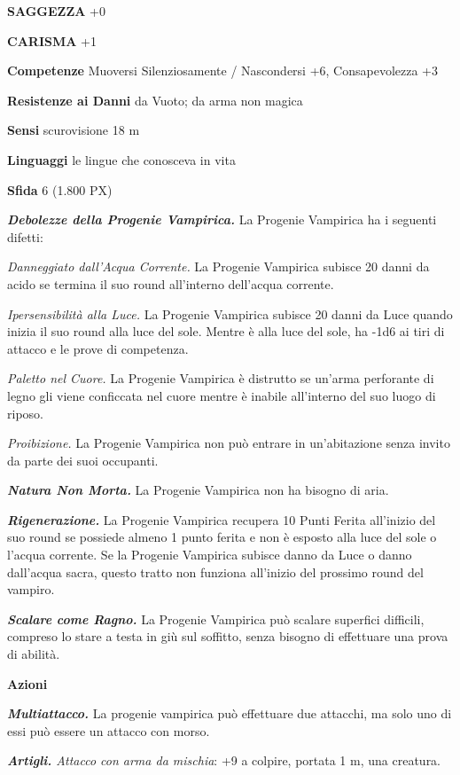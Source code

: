 \begin{multicols}{2}
\textbf{SAGGEZZA} +0

\textbf{CARISMA} +1

\textbf{Competenze} Muoversi Silenziosamente / Nascondersi +6, Consapevolezza +3

\textbf{Resistenze ai Danni} da Vuoto; da arma non magica

\textbf{Sensi} scurovisione 18 m

\textbf{Linguaggi} le lingue che conosceva in vita

\textbf{Sfida} 6 (1.800 PX)

\textit{\textbf{Debolezze della Progenie Vampirica.}} La Progenie Vampirica ha i seguenti difetti:

\textit{Danneggiato dall'Acqua Corrente.} La Progenie Vampirica subisce 20 danni da acido se termina il suo round all'interno dell'acqua corrente.

\textit{Ipersensibilità alla Luce.} La Progenie Vampirica subisce 20 danni da Luce quando inizia il suo round alla luce del sole. Mentre è alla luce del sole, ha -1d6 ai tiri di attacco e le prove di competenza.

\textit{Paletto nel Cuore.} La Progenie Vampirica è distrutto se un'arma perforante di legno gli viene conficcata nel cuore mentre è inabile all'interno del suo luogo di riposo.

\textit{Proibizione.} La Progenie Vampirica non può entrare in un'abitazione senza invito da parte dei suoi occupanti.

\textit{\textbf{Natura Non Morta.}} La Progenie Vampirica non ha bisogno di aria.

\textit{\textbf{Rigenerazione.}} La Progenie Vampirica recupera 10 Punti Ferita all'inizio del suo round se possiede almeno 1 punto ferita e non è esposto alla luce del sole o l'acqua corrente. Se la Progenie Vampirica subisce danno da Luce o danno dall'acqua sacra, questo tratto non funziona all'inizio del prossimo round del vampiro.

\textit{\textbf{Scalare come Ragno.}} La Progenie Vampirica può scalare superfici difficili, compreso lo stare a testa in giù sul soffitto, senza bisogno di effettuare una prova di abilità.

\textbf{Azioni}

\textit{\textbf{Multiattacco.}} La progenie vampirica può effettuare due attacchi, ma solo uno di essi può essere un attacco con morso.

\textit{\textbf{Artigli.} Attacco con arma da mischia}: +9 a colpire, portata 1 m, una creatura.


\end{multicols}
